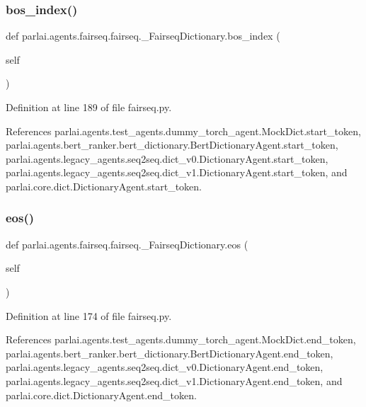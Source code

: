 \subsubsection{\texorpdfstring{bos\+\_\+index()}{bos\_index()}}
{\footnotesize\ttfamily def parlai.\+agents.\+fairseq.\+fairseq.\+\_\+\+Fairseq\+Dictionary.\+bos\+\_\+index (\begin{DoxyParamCaption}\item[{}]{self }\end{DoxyParamCaption})}



Definition at line 189 of file fairseq.\+py.



References parlai.\+agents.\+test\+\_\+agents.\+dummy\+\_\+torch\+\_\+agent.\+Mock\+Dict.\+start\+\_\+token, parlai.\+agents.\+bert\+\_\+ranker.\+bert\+\_\+dictionary.\+Bert\+Dictionary\+Agent.\+start\+\_\+token, parlai.\+agents.\+legacy\+\_\+agents.\+seq2seq.\+dict\+\_\+v0.\+Dictionary\+Agent.\+start\+\_\+token, parlai.\+agents.\+legacy\+\_\+agents.\+seq2seq.\+dict\+\_\+v1.\+Dictionary\+Agent.\+start\+\_\+token, and parlai.\+core.\+dict.\+Dictionary\+Agent.\+start\+\_\+token.

\mbox{\label{classparlai_1_1agents_1_1fairseq_1_1fairseq_1_1__FairseqDictionary_ab2d56873ca754183f48c20989267c2c4}} 
\subsubsection{\texorpdfstring{eos()}{eos()}}
{\footnotesize\ttfamily def parlai.\+agents.\+fairseq.\+fairseq.\+\_\+\+Fairseq\+Dictionary.\+eos (\begin{DoxyParamCaption}\item[{}]{self }\end{DoxyParamCaption})}



Definition at line 174 of file fairseq.\+py.



References parlai.\+agents.\+test\+\_\+agents.\+dummy\+\_\+torch\+\_\+agent.\+Mock\+Dict.\+end\+\_\+token, parlai.\+agents.\+bert\+\_\+ranker.\+bert\+\_\+dictionary.\+Bert\+Dictionary\+Agent.\+end\+\_\+token, parlai.\+agents.\+legacy\+\_\+agents.\+seq2seq.\+dict\+\_\+v0.\+Dictionary\+Agent.\+end\+\_\+token, parlai.\+agents.\+legacy\+\_\+agents.\+seq2seq.\+dict\+\_\+v1.\+Dictionary\+Agent.\+end\+\_\+token, and parlai.\+core.\+dict.\+Dictionary\+Agent.\+end\+\_\+token.

